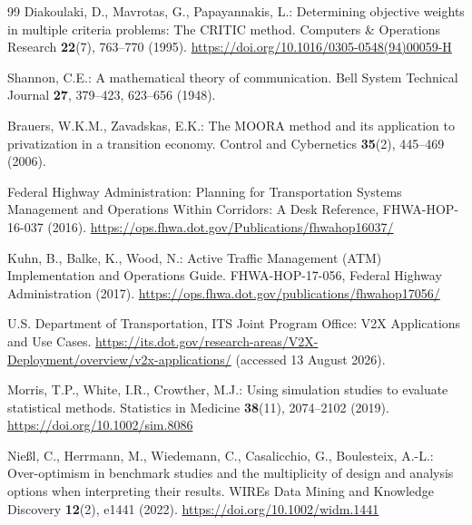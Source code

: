 \documentclass[runningheads]{llncs}
\begin{document}
\begin{thebibliography}{99}
Diakoulaki, D., Mavrotas, G., Papayannakis, L.:
Determining objective weights in multiple criteria problems: The CRITIC method.
Computers \& Operations Research \textbf{22}(7), 763--770 (1995).
\url{https://doi.org/10.1016/0305-0548(94)00059-H}

Shannon, C.E.:
A mathematical theory of communication.
Bell System Technical Journal \textbf{27}, 379--423, 623--656 (1948).

Brauers, W.K.M., Zavadskas, E.K.:
The MOORA method and its application to privatization in a transition economy.
Control and Cybernetics \textbf{35}(2), 445--469 (2006).

Federal Highway Administration:
Planning for Transportation Systems Management and Operations Within Corridors: A Desk
Reference, FHWA-HOP-16-037 (2016).
\url{https://ops.fhwa.dot.gov/Publications/fhwahop16037/}

Kuhn, B., Balke, K., Wood, N.:
Active Traffic Management (ATM) Implementation and Operations Guide.
FHWA-HOP-17-056, Federal Highway Administration (2017).
\url{https://ops.fhwa.dot.gov/publications/fhwahop17056/}

U.S. Department of Transportation, ITS Joint Program Office:
V2X Applications and Use Cases.
\url{https://its.dot.gov/research-areas/V2X-Deployment/overview/v2x-applications/}
(accessed 13 August 2026).

Morris, T.P., White, I.R., Crowther, M.J.:
Using simulation studies to evaluate statistical methods.
Statistics in Medicine \textbf{38}(11), 2074--2102 (2019).
\url{https://doi.org/10.1002/sim.8086}

Nie{\ss}l, C., Herrmann, M., Wiedemann, C., Casalicchio, G., Boulesteix, A.-L.:
Over-optimism in benchmark studies and the multiplicity of design and analysis options when
interpreting their results.
WIREs Data Mining and Knowledge Discovery \textbf{12}(2), e1441 (2022).
\url{https://doi.org/10.1002/widm.1441}

\end{thebibliography}
\end{document}
